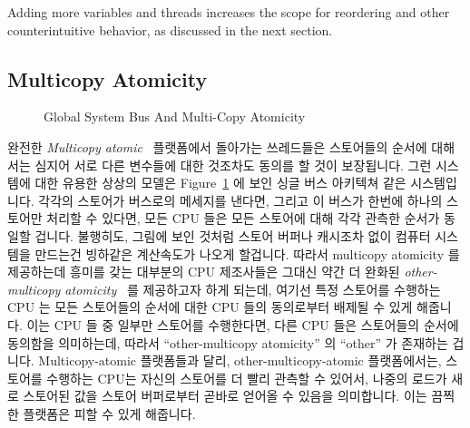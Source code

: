 Adding more variables and threads increases the scope for reordering
and other counterintuitive behavior, as discussed in the next section.
\fi

\subsection{Multicopy Atomicity}
\label{sec:memorder:Multicopy Atomicity}

\begin{figure}[tb]
\centering
{}
\caption{Global System Bus And Multi-Copy Atomicity}
\label{fig:memorder:Global System Bus And Multi-Copy Atomicity}
\end{figure}

완전한 \emph{Multicopy atomic}~\cite{Stone:1995:SP:623262.623912} 플랫폼에서
돌아가는 쓰레드들은 스토어들의 순서에 대해서는 심지어 서로 다른 변수들에 대한
것조차도 동의를 할 것이 보장됩니다.
그런 시스템에 대한 유용한 상상의 모델은
Figure~\ref{fig:memorder:Global System Bus And Multi-Copy Atomicity}
에 보인 싱글 버스 아키텍쳐 같은 시스템입니다.
각각의 스토어가 버스로의 메세지를 낸다면, 그리고 이 버스가 한번에 하나의
스토어만 처리할 수 있다면, 모든 CPU 들은 모든 스토어에 대해 각각 관측한 순서가
동일할 겁니다.
불행히도, 그림에 보인 것처럼 스토어 버퍼나 캐시조차 없이 컴퓨터 시스템을
만드는건 빙하같은 계산속도가 나오게 할겁니다.
따라서 multicopy atomicity 를 제공하는데 흥미를 갖는 대부분의 CPU 제조사들은
그대신 약간 더 완화된
\emph{other-multicopy atomicity}~\cite[Section B2.3]{ARMv8A:2017} 를 제공하고자
하게 되는데, 여기선 특정 스토어를 수행하는 CPU 는 모든 스토어들의 순서에 대한
CPU 들의 동의로부터 배제될 수 있게 해줍니다.
이는 CPU 들 중 일부만 스토어를 수행한다면, 다른 CPU 들은 스토어들의 순서에
동의함을 의미하는데, 따라서 ``other-multicopy atomicity'' 의 ``other'' 가
존재하는 겁니다.
Multicopy-atomic 플랫폼들과 달리, other-multicopy-atomic 플랫폼에서는, 스토어를
수행하는 CPU는 자신의 스토어를 더 빨리 관측할 수 있어서, 나중의 로드가 새로
스토어된 값을 스토어 버퍼로부터 곧바로 얻어올 수 있음을 의미합니다.
이는 끔찍한 플랫폼은 피할 수 있게 해줍니다.
\iffalse


